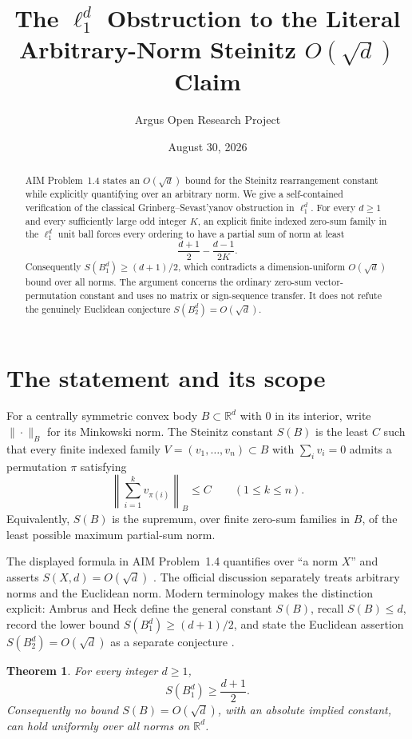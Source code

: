 \documentclass[10pt,reqno]{amsart}
\title[The $\ell_1$ obstruction to an arbitrary-norm Steinitz claim]
{The $\ell_1^d$ Obstruction to the Literal Arbitrary-Norm Steinitz $O(\sqrt d)$ Claim}
\author{Argus Open Research Project}
\date{August 30, 2026}
\newtheorem{theorem}{Theorem}[section]
\theoremstyle{definition}
\begin{document}
\begin{abstract}
AIM Problem~1.4 states an $O(\sqrt d)$ bound for the Steinitz rearrangement constant while explicitly quantifying over an arbitrary norm. We give a self-contained verification of the classical Grinberg--Sevast'yanov obstruction in $\ell_1^d$. For every $d\geq1$ and every sufficiently large odd integer $K$, an explicit finite indexed zero-sum family in the $\ell_1^d$ unit ball forces every ordering to have a partial sum of norm at least
\[
  \frac{d+1}{2}-\frac{d-1}{2K}.
\]
Consequently $S(B_1^d)\geq(d+1)/2$, which contradicts a dimension-uniform $O(\sqrt d)$ bound over all norms. The argument concerns the ordinary zero-sum vector-permutation constant and uses no matrix or sign-sequence transfer. It does not refute the genuinely Euclidean conjecture $S(B_2^d)=O(\sqrt d)$.
\end{abstract}

\maketitle

\section{The statement and its scope}

For a centrally symmetric convex body $B\subset\mathbb R^d$ with $0$ in its interior, write $\|\cdot\|_B$ for its Minkowski norm. The Steinitz constant $S(B)$ is the least $C$ such that every finite indexed family $V=(v_1,\ldots,v_n)\subset B$ with $\sum_i v_i=0$ admits a permutation $\pi$ satisfying
\[
  \left\|\sum_{i=1}^k v_{\pi(i)}\right\|_B\leq C
  \qquad(1\leq k\leq n).
\]
Equivalently, $S(B)$ is the supremum, over finite zero-sum families in $B$, of the least possible maximum partial-sum norm.

The displayed formula in AIM Problem~1.4 quantifies over ``a norm $X$'' and asserts $S(X,d)=O(\sqrt d)$ \cite{AIM}. The official discussion separately treats arbitrary norms and the Euclidean norm. Modern terminology makes the distinction explicit: Ambrus and Heck define the general constant $S(B)$, recall $S(B)\leq d$, record the lower bound $S(B_1^d)\geq(d+1)/2$, and state the Euclidean assertion $S(B_2^d)=O(\sqrt d)$ as a separate conjecture \cite{AmbrusHeck}.

\begin{theorem}\label{thm:lower}
For every integer $d\geq1$,
\[
  S(B_1^d)\geq\frac{d+1}{2}.
\]
Consequently no bound $S(B)=O(\sqrt d)$, with an absolute implied constant, can hold uniformly over all norms on $\mathbb R^d$.
\end{theorem}
\end{document}
